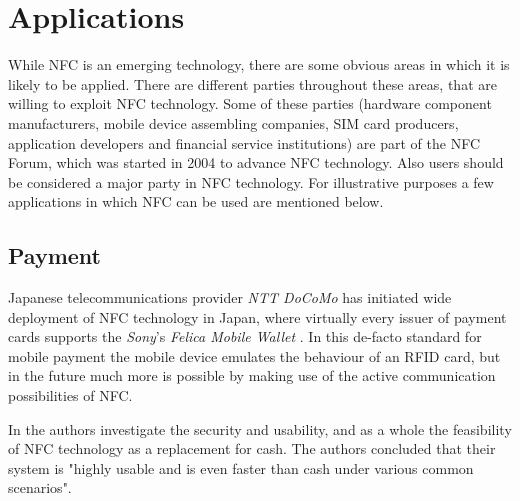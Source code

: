 \section{Applications}
While NFC is an emerging technology, there are some obvious areas in which it is likely to be applied. There are different parties throughout these areas, that are willing to exploit NFC technology. Some of these parties (hardware component manufacturers, mobile device assembling companies, SIM card producers, application developers and financial service institutions) are part of the NFC Forum, which was started in 2004 to advance NFC technology. Also users should be considered a major party in NFC technology.
For illustrative purposes a few applications in which NFC can be used are mentioned below.

\subsection{Payment}
Japanese telecommunications provider \textit{NTT DoCoMo} has initiated wide deployment of NFC technology in Japan, where virtually every issuer of payment cards supports the \textit{Sony}'s \textit{Felica Mobile Wallet} \cite{3g_japan}.
In this de-facto standard for mobile payment the mobile device emulates the behaviour of an RFID card, but in the future much more is possible by making use of the active communication possibilities of NFC. %

In \cite{1555846} the authors investigate the security and usability, and as a whole the feasibility of NFC technology as a replacement for cash.
The authors concluded that their system is "highly usable and is even faster than cash under various common scenarios".


